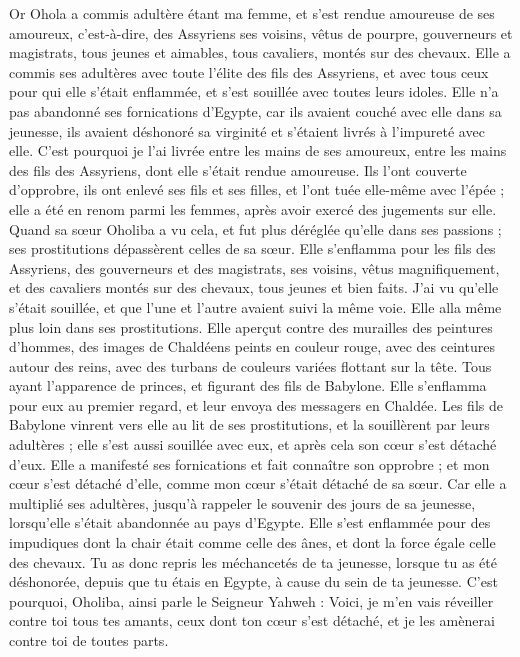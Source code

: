 \begin{multicols}{2}
Or Ohola a commis adultère étant ma femme, et s'est rendue amoureuse de ses amoureux, c'est-à-dire, des Assyriens ses voisins,
vêtus de pourpre, gouverneurs et magistrats, tous jeunes et aimables, tous cavaliers, montés sur des chevaux.
Elle a commis ses adultères avec toute l'élite des fils des Assyriens, et avec tous ceux pour qui elle s’était enflammée, et s'est souillée avec toutes leurs idoles.
Elle n'a pas abandonné ses fornications d'Egypte, car ils avaient couché avec elle dans sa jeunesse, ils avaient déshonoré sa virginité et s'étaient livrés à l'impureté avec elle.
C'est pourquoi je l'ai livrée entre les mains de ses amoureux, entre les mains des fils des Assyriens, dont elle s'était rendue amoureuse.
Ils l'ont couverte d'opprobre, ils ont enlevé ses fils et ses filles, et l'ont tuée elle-même avec l'épée ; elle a été en renom parmi les femmes, après avoir exercé des jugements sur elle.
Quand sa sœur Oholiba a vu cela, et fut plus déréglée qu'elle dans ses passions ; ses prostitutions dépassèrent celles de sa sœur.
Elle s’enflamma pour les fils des Assyriens, des gouverneurs et des magistrats, ses voisins, vêtus magnifiquement, et des cavaliers montés sur des chevaux, tous jeunes et bien faits.
J'ai vu qu'elle s'était souillée, et que l’une et l’autre avaient suivi la même voie.
Elle alla même plus loin dans ses prostitutions. Elle aperçut contre des murailles des peintures d’hommes, des images de Chaldéens peints en couleur rouge,
avec des ceintures autour des reins, avec des turbans de couleurs variées flottant sur la tête. Tous ayant l’apparence de princes, et figurant des fils de Babylone.
Elle s’enflamma pour eux au premier regard, et leur envoya des messagers en Chaldée.
Les fils de Babylone vinrent vers elle au lit de ses prostitutions, et la souillèrent par leurs adultères ; elle s'est aussi souillée avec eux, et après cela son cœur s'est détaché d'eux.
Elle a manifesté ses fornications et fait connaître son opprobre ; et mon cœur s'est détaché d'elle, comme mon cœur s'était détaché de sa sœur.
Car elle a multiplié ses adultères, jusqu'à rappeler le souvenir des jours de sa jeunesse, lorsqu’elle s'était abandonnée au pays d'Egypte.
Elle s’est enflammée pour des impudiques dont la chair était comme celle des ânes, et dont la force égale celle des chevaux.
Tu as donc repris les méchancetés de ta jeunesse, lorsque tu as été déshonorée, depuis que tu étais en Egypte, à cause du sein de ta jeunesse.
C'est pourquoi, Oholiba, ainsi parle le Seigneur Yahweh : Voici, je m'en vais réveiller contre toi tous tes amants, ceux dont ton cœur s'est détaché, et je les amènerai contre toi de toutes parts.

\end{multicols}
